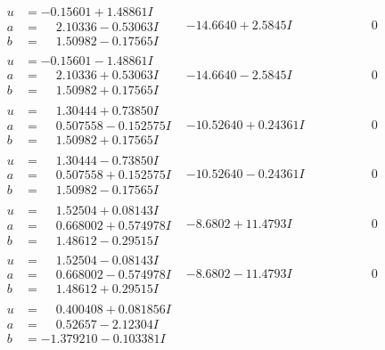 \documentclass[1p]{elsarticle_modified}
\theoremstyle{definition}
\begin{document}
$$\begin{array}{c|c|c}
\begin{aligned}
u &= -0.15601 + 1.48861 I \\
a &= \phantom{-}2.10336 - 0.53063 I \\
b &= \phantom{-}1.50982 - 0.17565 I\end{aligned}
 & -14.6640 + 2.5845 I & \phantom{-0.000000 } 0 \\ \hline\begin{aligned}
u &= -0.15601 - 1.48861 I \\
a &= \phantom{-}2.10336 + 0.53063 I \\
b &= \phantom{-}1.50982 + 0.17565 I\end{aligned}
 & -14.6640 - 2.5845 I & \phantom{-0.000000 } 0 \\ \hline\begin{aligned}
u &= \phantom{-}1.30444 + 0.73850 I \\
a &= \phantom{-}0.507558 - 0.152575 I \\
b &= \phantom{-}1.50982 + 0.17565 I\end{aligned}
 & -10.52640 + 0.24361 I & \phantom{-0.000000 } 0 \\ \hline\begin{aligned}
u &= \phantom{-}1.30444 - 0.73850 I \\
a &= \phantom{-}0.507558 + 0.152575 I \\
b &= \phantom{-}1.50982 - 0.17565 I\end{aligned}
 & -10.52640 - 0.24361 I & \phantom{-0.000000 } 0 \\ \hline\begin{aligned}
u &= \phantom{-}1.52504 + 0.08143 I \\
a &= \phantom{-}0.668002 + 0.574978 I \\
b &= \phantom{-}1.48612 - 0.29515 I\end{aligned}
 & -8.6802 + 11.4793 I & \phantom{-0.000000 } 0 \\ \hline\begin{aligned}
u &= \phantom{-}1.52504 - 0.08143 I \\
a &= \phantom{-}0.668002 - 0.574978 I \\
b &= \phantom{-}1.48612 + 0.29515 I\end{aligned}
 & -8.6802 - 11.4793 I & \phantom{-0.000000 } 0 \\ \hline\begin{aligned}
u &= \phantom{-}0.400408 + 0.081856 I \\
a &= \phantom{-}0.52657 - 2.12304 I \\
b &= -1.379210 - 0.103381 I\end{aligned}

\end{array}$$
\end{document}
